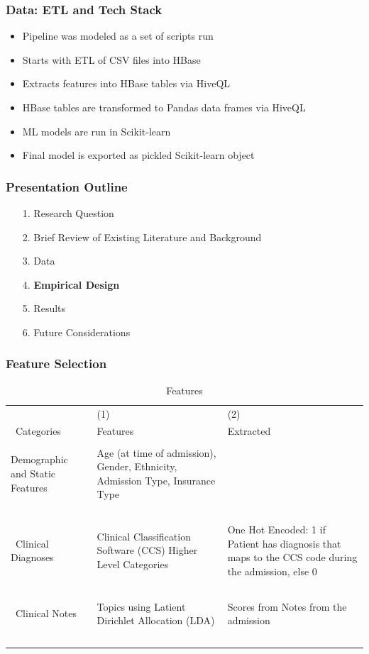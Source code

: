 \documentclass{beamer}
\begin{document}
\begin{frame}
\frametitle{Data: ETL and Tech Stack}
\label{ETL2}
\begin{itemize}
\item Pipeline was modeled as a set of scripts run
\item Starts with ETL of CSV files into HBase
\item Extracts features into HBase tables via HiveQL
\item HBase tables are transformed to Pandas data frames via HiveQL
\item ML models are run in Scikit-learn
\item Final model is exported as pickled Scikit-learn object
\end{itemize}
\end{frame}

\begin{frame}
\label{Presentation Outline 4}
\frametitle{Presentation Outline}
\begin{enumerate}
\item[1.] Research Question
\newline
\item[2.] Brief Review of Existing Literature and Background
\newline
\item[3.] Data
\newline
\item[4.] \textbf{Empirical Design}
\newline
\item[5.] Results
\newline
\item[6.] Future Considerations
\end{enumerate}
\end{frame}

\begin{frame}
\label{Empirical Design}
\frametitle{Feature Selection}

\begin{table}[H]
\tiny
{}%
\caption{Features}
\label{Features}
\centering
\begin{tabularx}{\textwidth}{l C C}\hline
 & (1) & (2) \\\
Categories & Features & Extracted \\ \hline
 &  &   \\
Demographic and Static Features & Age (at time of admission), Gender, Ethnicity, Admission Type, Insurance Type &  \\\
\\\
Clinical Diagnoses & Clinical Classification Software (CCS) Higher Level Categories & One Hot Encoded: 1 if Patient has diagnosis that maps to the CCS code during the admission, else 0 \\\
\\\
Clinical Notes & Topics using Latient Dirichlet Allocation (LDA) & Scores from Notes from the admission \\\
\end{tabularx}
\end{table}
\end{frame}
\end{document}
